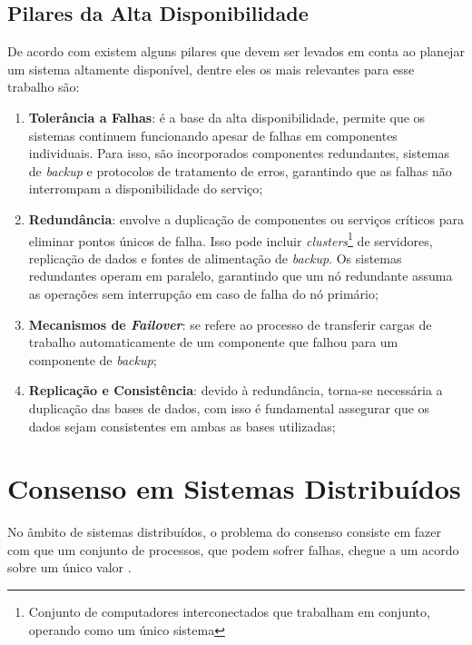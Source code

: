     \subsection{Pilares da Alta Disponibilidade} 
        De acordo com  existem alguns pilares que devem ser levados em conta ao planejar um sistema altamente disponível, dentre eles os mais relevantes para esse trabalho são:
        \begin{enumerate}
            \item \textbf{Tolerância a Falhas}: é a base da alta disponibilidade, permite que os sistemas continuem funcionando apesar de falhas em componentes individuais. Para isso, são incorporados componentes redundantes, sistemas de \textit{backup} e protocolos de tratamento de erros, garantindo que as falhas não interrompam a disponibilidade do serviço;
            
            \item \textbf{Redundância}: envolve a duplicação de componentes ou serviços críticos para eliminar pontos únicos de falha. Isso pode incluir \textit{clusters}\footnote{Conjunto de computadores interconectados que trabalham em conjunto, operando como um único sistema} de servidores, replicação de dados e fontes de alimentação de \textit{backup}. Os sistemas redundantes operam em paralelo, garantindo que um nó redundante assuma as operações sem interrupção em caso de falha do nó primário;
            
            \item \textbf{Mecanismos de \textit{Failover}}: se refere ao processo de transferir cargas de trabalho automaticamente de um componente que falhou para um componente de \textit{backup};
            
            \item \textbf{Replicação e Consistência}: devido à redundância, torna-se necessária a duplicação das bases de dados, com isso é fundamental assegurar que os dados sejam consistentes em ambas as bases utilizadas;
            
        \end{enumerate}
    
\section{Consenso em Sistemas Distribuídos}
    No âmbito de sistemas distribuídos, o problema do consenso consiste em fazer com que um conjunto de processos, que podem sofrer falhas, chegue a um acordo sobre um único valor \cite{lamport2001paxos}.

